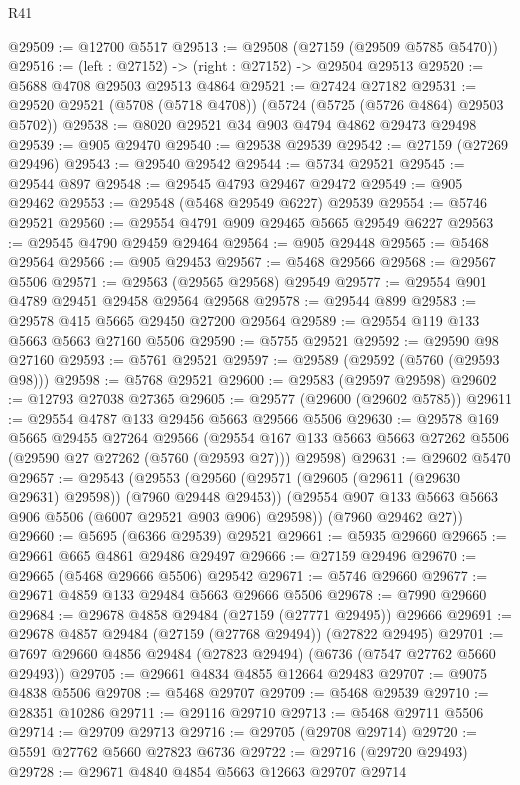 \begin{lexlean}{R41}
\begin{coremodule}
@29509 := @12700 @5517
@29513 := @29508 (@27159 (@29509 @5785 @5470))
@29516 := (left : @27152) -> (right : @27152) -> @29504 @29513
@29520 := @5688 @4708 @29503 @29513 @4864
@29521 := @27424 @27182
@29531 := @29520 @29521 (@5708 (@5718 @4708)) (@5724 (@5725 (@5726 @4864) @29503 @5702))
@29538 := @8020 @29521 @34 @903 @4794 @4862 @29473 @29498
@29539 := @905 @29470
@29540 := @29538 @29539
@29542 := @27159 (@27269 @29496)
@29543 := @29540 @29542
@29544 := @5734 @29521
@29545 := @29544 @897
@29548 := @29545 @4793 @29467 @29472
@29549 := @905 @29462
@29553 := @29548 (@5468 @29549 @6227) @29539
@29554 := @5746 @29521
@29560 := @29554 @4791 @909 @29465 @5665 @29549 @6227
@29563 := @29545 @4790 @29459 @29464
@29564 := @905 @29448
@29565 := @5468 @29564
@29566 := @905 @29453
@29567 := @5468 @29566
@29568 := @29567 @5506
@29571 := @29563 (@29565 @29568) @29549
@29577 := @29554 @901 @4789 @29451 @29458 @29564 @29568
@29578 := @29544 @899
@29583 := @29578 @415 @5665 @29450 @27200 @29564
@29589 := @29554 @119 @133 @5663 @5663 @27160 @5506
@29590 := @5755 @29521
@29592 := @29590 @98 @27160
@29593 := @5761 @29521
@29597 := @29589 (@29592 (@5760 (@29593 @98)))
@29598 := @5768 @29521
@29600 := @29583 (@29597 @29598)
@29602 := @12793 @27038 @27365
@29605 := @29577 (@29600 (@29602 @5785))
@29611 := @29554 @4787 @133 @29456 @5663 @29566 @5506
@29630 := @29578
    @169
    @5665
    @29455
    @27264
    @29566
    (@29554 @167 @133 @5663 @5663 @27262 @5506 (@29590 @27 @27262 (@5760 (@29593 @27))) @29598)
@29631 := @29602 @5470
@29657 := @29543
    (@29553
      (@29560
        (@29571 (@29605 (@29611 (@29630 @29631) @29598)) (@7960 @29448 @29453))
        (@29554 @907 @133 @5663 @5663 @906 @5506 (@6007 @29521 @903 @906) @29598))
      (@7960 @29462 @27))
@29660 := @5695 (@6366 @29539) @29521
@29661 := @5935 @29660
@29665 := @29661 @665 @4861 @29486 @29497
@29666 := @27159 @29496
@29670 := @29665 (@5468 @29666 @5506) @29542
@29671 := @5746 @29660
@29677 := @29671 @4859 @133 @29484 @5663 @29666 @5506
@29678 := @7990 @29660
@29684 := @29678 @4858 @29484 (@27159 (@27771 @29495)) @29666
@29691 := @29678 @4857 @29484 (@27159 (@27768 @29494)) (@27822 @29495)
@29701 := @7697 @29660 @4856 @29484 (@27823 @29494) (@6736 (@7547 @27762 @5660 @29493))
@29705 := @29661 @4834 @4855 @12664 @29483
@29707 := @9075 @4838 @5506
@29708 := @5468 @29707
@29709 := @5468 @29539
@29710 := @28351 @10286
@29711 := @29116 @29710
@29713 := @5468 @29711 @5506
@29714 := @29709 @29713
@29716 := @29705 (@29708 @29714)
@29720 := @5591 @27762 @5660 @27823 @6736
@29722 := @29716 (@29720 @29493)
@29728 := @29671 @4840 @4854 @5663 @12663 @29707 @29714

\end{coremodule}
\end{lexlean}
